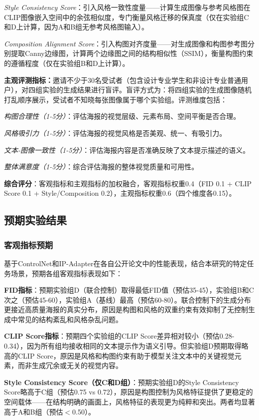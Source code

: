 \documentclass[12pt,a4paper]{ctexart}
\newcommand{\controlnet}{ControlNet}
\newcommand{\ipadapter}{IP-Adapter}
\begin{document}
\textit{Style Consistency Score}：引入风格一致性度量——计算生成图像与参考风格图在CLIP图像嵌入空间中的余弦相似度，专门衡量风格迁移的保真度（仅在实验组C和D上计算，因为A和B组无参考风格图输入）。

\textit{Composition Alignment Score}：引入构图对齐度量——对生成图像和构图参考图分别提取Canny边缘图，计算两个边缘图之间的结构相似性（SSIM），衡量构图约束的遵循程度（仅在实验组B和D上计算）。

\textbf{主观评测指标：}邀请不少于30名受试者（包含设计专业学生和非设计专业普通用户），对四组实验的生成结果进行盲评。盲评方式为：将四组实验的生成图像随机打乱顺序展示，受试者不知晓每张图像属于哪个实验组。评测维度包括：

\textit{构图合理性（1-5分）}：评估海报的视觉层级、元素布局、空间平衡是否合理。

\textit{风格吸引力（1-5分）}：评估海报的视觉风格是否美观、统一、有吸引力。

\textit{文本-图像一致性（1-5分）}：评估海报内容是否准确反映了文本提示描述的语义。

\textit{整体满意度（1-5分）}：综合评估海报的整体视觉质量和可用性。

\textbf{综合评分}：客观指标和主观指标的加权融合，客观指标权重0.4（FID 0.1 + CLIP Score 0.1 + Style/Composition 0.2），主观指标权重0.6（四个维度各0.15）。

\subsection{预期实验结果}

\subsubsection{客观指标预期}

基于\controlnet{}和\ipadapter{}在各自公开论文中的性能表现，结合本研究的特定任务场景，预期各组客观指标表现如下：

\textbf{FID指标}：预期实验组D（联合控制）取得最低FID值（预估35-45），实验组B和C次之（预估45-60），实验组A（基线）最高（预估60-80）。联合控制下的生成分布更接近高质量海报的真实分布，原因是构图和风格的双重约束有效抑制了无控制生成中常见的结构紊乱和风格杂乱问题。

\textbf{CLIP Score指标}：预期四个实验组的CLIP Score差异相对较小（预估0.28-0.34），因为所有组均接收相同的文本提示作为语义引导。但实验组D预期取得略高的CLIP Score，原因是风格和构图约束有助于模型关注文本中的关键视觉元素，而非生成冗余或无关的视觉内容。

\textbf{Style Consistency Score（仅C和D组）}：预期实验组D的Style Consistency Score略高于C组（预估0.75 vs 0.72），原因是构图控制为风格特征提供了更稳定的空间载体——在结构明确的画面上，风格特征的表现更为纯粹和突出。两者均显著高于A和B组（预估$<$0.50）。
\end{document}
